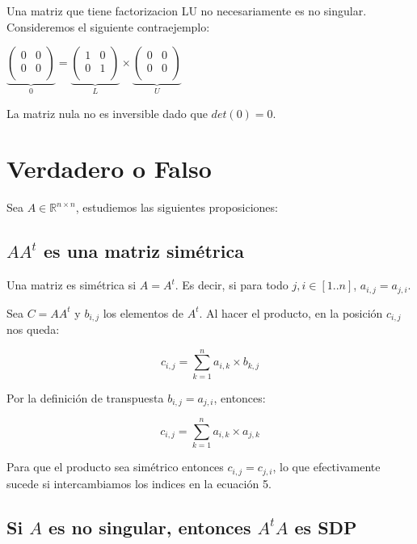 \documentclass[10pt,a4paper]{article}
\begin{document}
Una matriz que tiene factorizacion LU no necesariamente es no singular. Consideremos el siguiente contraejemplo:

$\underbrace{\left(
\begin{matrix}
0 & 0 \\
0 & 0 \\
\end{matrix}\right)}_{0}
=
\underbrace{\left(
\begin{matrix}
1 & 0 \\
0 & 1 \\
\end{matrix}\right)}_{L}
\times
\underbrace{\left(
\begin{matrix}
0 & 0 \\
0 & 0 \\
\end{matrix}\right)}_{U}$

La matriz nula no es inversible dado que $det(0)=0$.

\section{Verdadero o Falso}

Sea $A \in \mathbb{R}^{n \times n}$, estudiemos las siguientes proposiciones:

\subsection{$AA^t$ es una matriz simétrica}

Una matriz es simétrica si $A = A^t$. Es decir, si para todo $j,i \in [1..n]$, $a_{i,j} = a_{j,i}$.

Sea $C = AA^t$ y $b_{i,j}$ los elementos de $A^t$. Al hacer el producto, en la posición $c_{i,j}$ nos queda:

\begin{equation}
c_{i,j} = \sum_{k=1}^{n} a_{i,k} \times b_{k,j}
\end{equation}

Por la definición de transpuesta $b_{i,j} = a_{j,i}$, entonces:

\begin{equation}
c_{i,j} = \sum_{k=1}^{n} a_{i,k} \times a_{j,k}
\end{equation}

Para que el producto sea simétrico entonces $c_{i,j} = c_{j,i}$, lo que efectivamente sucede si intercambiamos los indices en la ecuación 5. 

\subsection{Si $A$ es no singular, entonces $A^tA$ es SDP}
\end{document}
